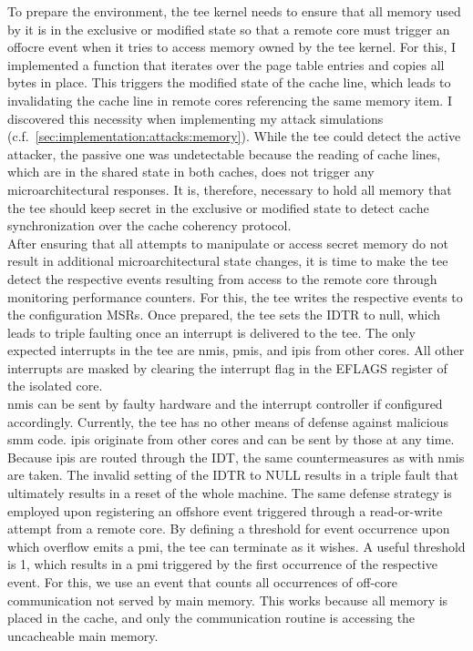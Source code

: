 To prepare the environment, the \gls{tee} kernel needs to ensure that all memory
used by it is in the exclusive or modified state so that a remote core must
trigger an offocre event
when it tries to access memory owned by the \gls{tee} kernel. For this, I
implemented a function that iterates over the page table entries and copies all
bytes in place. This triggers the modified state of the cache line, which leads
to invalidating the cache line in remote cores referencing the same memory item.
I discovered this necessity when implementing my attack simulations
(c.f.~\ref{sec:implementation:attacks:memory}). While the \gls{tee} could detect
the active attacker, the passive one was undetectable because the reading of
cache lines, which are in the shared state in both caches, does not trigger any
microarchitectural responses. It is, therefore, necessary to hold all memory
that the \gls{tee} should keep secret in the exclusive or modified state to
detect cache synchronization over the cache coherency protocol.\\

After ensuring that all attempts to manipulate or access secret memory do not
result in additional microarchitectural state changes, it is time to make the
\gls{tee} detect the respective events resulting from access to the remote core
through monitoring performance counters. For this, the \gls{tee} writes the
respective events to the configuration MSRs. Once prepared, the \gls{tee} sets
the IDTR to null, which leads to triple faulting once an interrupt is delivered
to the \gls{tee}. The only expected interrupts in the \gls{tee} are \glspl{nmi},
\glspl{pmi}, and \glspl{ipi} from other cores. All other interrupts are masked
by clearing the interrupt flag in the EFLAGS register of the isolated core. \\

\glspl{nmi} can be sent by faulty hardware and the interrupt controller if
configured accordingly. Currently, the \gls{tee} has no other means of defense
against malicious \gls{smm} code. \glspl{ipi} originate from other cores and can
be sent by those at any time. Because \glspl{ipi} are routed through the IDT,
the same countermeasures as with \glspl{nmi} are taken. The invalid setting of
the IDTR to NULL results in a triple fault that ultimately results in a reset of
the whole machine. The same defense strategy is employed upon registering an
offshore event triggered through a read-or-write attempt from a remote core. By
defining a threshold for event occurrence upon which overflow emits a \gls{pmi},
the \gls{tee} can terminate as it wishes. A useful threshold is 1, which results
in a \gls{pmi} triggered by the first occurrence of the respective event. For
this, we use an event that counts all occurrences of off-core communication not
served by main memory. This works because all memory is placed in the cache, and
only the communication routine is accessing the uncacheable main memory. \\

